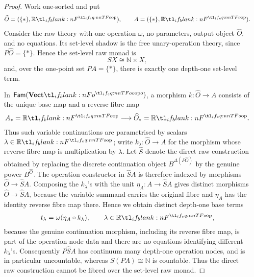 \documentclass[11pt,a4paper]{article}
\theoremstyle{definition}
\theoremstyle{remark}
\providecommand{\N}{\mathbb{N}}
\providecommand{\Fam}[1]{\mathsf{Fam}(#1)}
\begin{document}
\begin{proof}
  Work one-sorted and put
  \[
    \widehat O=(\{*\},\R),
    \qquad
    A=(\{*\},\R).
  \]
  Consider the raw theory with one operation \(\omega\), no parameters, output
  object \(\widehat O\), and no equations. Its set-level shadow is the free
  unary-operation theory, since \(P\widehat O=\{*\}\). Hence the set-level raw
  monad is
  \[
    SX\cong \N\times X,
  \]
  and, over the one-point set \(PA=\{*\}\), there is exactly one depth-one
  set-level term.

  In \(\Fam{\Vect[o]}\), a morphism
  \(k:\widehat O\to A\) consists of the unique base map and a reverse fibre map
  \[
    A_*=\R\longrightarrow \widehat O_*=\R.
  \]
  Thus such variable continuations are parametrised by scalars
  \(\lambda\in\R\); write \(k_{\lambda}:\widehat O\to A\) for the morphism whose
  reverse fibre map is multiplication by \(\lambda\). Let \(\widehat S\) denote
  the direct raw construction obtained by replacing the discrete continuation
  object \(B^{\Delta(P\widehat O)}\) by the genuine power \(B^{\widehat O}\).
  The operation constructor in \(\widehat S A\) is therefore indexed by
  morphisms \(\widehat O\to\widehat S A\). Composing the \(k_{\lambda}\)'s with
  the unit \(\eta_A:A\to\widehat S A\) gives distinct morphisms
  \(\widehat O\to\widehat S A\), because the variable summand carries the
  original fibre and \(\eta_A\) has the identity reverse fibre map there. Hence
  we obtain distinct depth-one base terms
  \[
    t_{\lambda}=\omega(\eta_A\circ k_{\lambda}),
    \qquad \lambda\in\R,
  \]
  because the genuine continuation morphism, including its reverse fibre map, is
  part of the operation-node data and there are no equations identifying
  different \(k_{\lambda}\)'s.
  Consequently \(P\widehat S A\) has continuum many depth-one operation nodes,
  and is in particular uncountable, whereas \(S(PA)\cong\N\) is countable. Thus
  the direct raw construction cannot be fibred over the set-level raw monad.


\end{proof}
\end{document}

